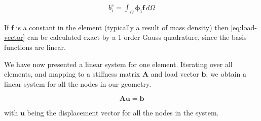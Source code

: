 \begin{align}
\label{eq:load-vector}
b^e_i = 
\int_{\Omega} \bm{\phi_i} \bm{f} \, d\Omega
\end{align}

If $\bm{f}$ is a constant in the element (typically a result of mass density) then \eqref{eq:load-vector} can be calculated exact by a 1 order Gauss quadrature, since the basis functions are linear. 

We have now presented a linear system for one element. Iterating over all elements, and mapping to a stiffness matrix $\bm{A}$ and load vector $\bm{b}$, we obtain a linear system for all the nodes in our geometry. 

\begin{equation}
\bm{A} \bm{u} = \bm{b}
\end{equation}

with $\bm{u}$ being the displacement vector for all the nodes in the system. 